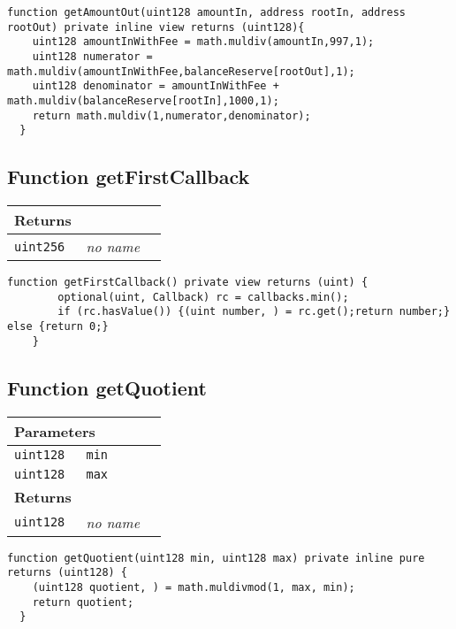 \begin{lstlisting}[firstnumber=157]
  function getAmountOut(uint128 amountIn, address rootIn, address rootOut) private inline view returns (uint128){
    uint128 amountInWithFee = math.muldiv(amountIn,997,1);
    uint128 numerator = math.muldiv(amountInWithFee,balanceReserve[rootOut],1);
    uint128 denominator = amountInWithFee + math.muldiv(balanceReserve[rootIn],1000,1);
    return math.muldiv(1,numerator,denominator);
  }
\end{lstlisting}

\subsection{Function getFirstCallback}


\ifsoltables
\noindent\begin{tabular}{|l|l|p{5cm}|}\hline
\multicolumn{3}{|l|}{\bf Returns}\\\hline
\tt uint256 & {\em no name} &\\\hline
\end{tabular}
\fi

\vspace{2cm}

\begin{lstlisting}[firstnumber=242]
  function getFirstCallback() private view returns (uint) {
		optional(uint, Callback) rc = callbacks.min();
		if (rc.hasValue()) {(uint number, ) = rc.get();return number;} else {return 0;}
	}
\end{lstlisting}

\subsection{Function getQuotient}


\ifsoltables
\noindent\begin{tabular}{|l|l|p{5cm}|}\hline
\multicolumn{3}{|l|}{\bf Parameters}\\\hline
\tt uint128 & \tt min &\\\hline
\tt uint128 & \tt max &\\\hline
\multicolumn{3}{|l|}{\bf Returns}\\\hline
\tt uint128 & {\em no name} &\\\hline
\end{tabular}
\fi

\vspace{2cm}

\begin{lstlisting}[firstnumber=165]
  function getQuotient(uint128 min, uint128 max) private inline pure returns (uint128) {
    (uint128 quotient, ) = math.muldivmod(1, max, min);
    return quotient;
  }
\end{lstlisting}

